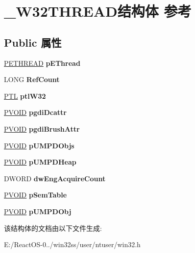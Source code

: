 \hypertarget{struct___w32_t_h_r_e_a_d}{}\section{\+\_\+\+W32\+T\+H\+R\+E\+A\+D结构体 参考}
\label{struct___w32_t_h_r_e_a_d}
\subsection*{Public 属性}
\begin{DoxyCompactItemize}
\item 
\mbox{\label{struct___w32_t_h_r_e_a_d_ad3ad400d9c5fecff793e0e3706b6e092}} 
\hyperlink{struct___e_t_h_r_e_a_d}{P\+E\+T\+H\+R\+E\+AD} {\bfseries p\+E\+Thread}
\item 
\mbox{\label{struct___w32_t_h_r_e_a_d_af42138f9b198aca456a8addc2ca7454f}} 
L\+O\+NG {\bfseries Ref\+Count}
\item 
\mbox{\label{struct___w32_t_h_r_e_a_d_a6aaddfab528a52b2d6c40acd8927bff9}} 
\hyperlink{struct___t_l}{P\+TL} {\bfseries ptl\+W32}
\item 
\mbox{\label{struct___w32_t_h_r_e_a_d_a0c92f1c1a6a772fc38bd830a52083384}} 
\hyperlink{interfacevoid}{P\+V\+O\+ID} {\bfseries pgdi\+Dcattr}
\item 
\mbox{\label{struct___w32_t_h_r_e_a_d_afd9831cbf583bcdff782f72d8ce9c091}} 
\hyperlink{interfacevoid}{P\+V\+O\+ID} {\bfseries pgdi\+Brush\+Attr}
\item 
\mbox{\label{struct___w32_t_h_r_e_a_d_a0c3b12c71adef0db613718e8befde38c}} 
\hyperlink{interfacevoid}{P\+V\+O\+ID} {\bfseries p\+U\+M\+P\+D\+Objs}
\item 
\mbox{\label{struct___w32_t_h_r_e_a_d_aa0dc7139812d2cab69bdec1a7d9e6177}} 
\hyperlink{interfacevoid}{P\+V\+O\+ID} {\bfseries p\+U\+M\+P\+D\+Heap}
\item 
\mbox{\label{struct___w32_t_h_r_e_a_d_aed93b934f01ff29427d84b89b6de025a}} 
D\+W\+O\+RD {\bfseries dw\+Eng\+Acquire\+Count}
\item 
\mbox{\label{struct___w32_t_h_r_e_a_d_ae7488e57c480aefe94d2562e58078513}} 
\hyperlink{interfacevoid}{P\+V\+O\+ID} {\bfseries p\+Sem\+Table}
\item 
\mbox{\label{struct___w32_t_h_r_e_a_d_a89e52c645bbc34ad3d790531e4062fb6}} 
\hyperlink{interfacevoid}{P\+V\+O\+ID} {\bfseries p\+U\+M\+P\+D\+Obj}
\end{DoxyCompactItemize}


该结构体的文档由以下文件生成\+:\begin{DoxyCompactItemize}
\item 
E\+:/\+React\+O\+S-\/0../win32ss/user/ntuser/win32.\+h\end{DoxyCompactItemize}
